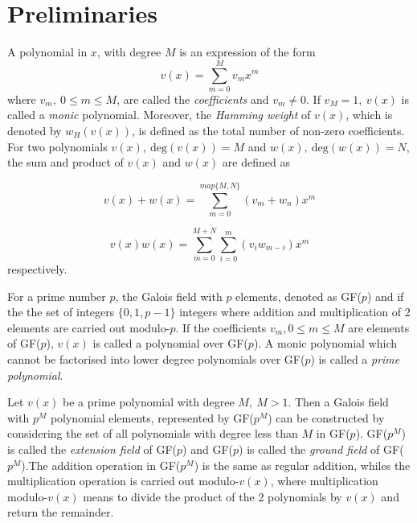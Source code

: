 \section{Preliminaries}
\label{secPrelim}

A polynomial in $x$, with degree $M$ is an expression of the form
\begin{equation*}
v(x) = \sum_{m=0}^{M} v_mx^m
\end{equation*}
where $v_m,~0 \leq m \leq M$, are called the \textit{coefficients}  and $v_m \neq 0$. If $v_M=1,~v(x)$ is called a \textit{monic} polynomial.
Moreover, the \textit{Hamming weight} of $v(x)$, which is denoted by $w_H(v(x))$, is defined as the total number of non-zero coefficients.
For two polynomials $v(x),~\text{deg}(v(x))=M$ and $w(x),~\text{deg}(w(x))=N$, the sum and product of $v(x)$ and $w(x)$ are defined as 

\begin{equation*}
v(x)+w(x)=\sum_{m=0}^{map\{ M,N\}} (v_m +w_n)x^m
\end{equation*}

\begin{equation*}
v(x)w(x)=\sum_{m=0}^{ M+N} \sum_{i=0}^{m} (v_i w_{m-i})x^m
\end{equation*}
 respectively.

For a prime number $p$, the Galois field with $p$ elements, denoted as GF($p$) and if the the set of integers $\{ 0,1,p-1\}$ integers where addition and multiplication of 2 elements are carried out modulo-$p$. If the coefficients $v_m, 0 \leq m \leq M$ are elements of GF($p$), $v(x)$ is called a polynomial over GF($p$). 
A monic polynomial which cannot be factorised into lower degree polynomials over GF($p$) is called a \textit{prime polynomial}.

Let $v(x)$ be a prime polynomial with degree $M,~M>1$. Then a Galois field with $p^M$ polynomial elements, represented by GF($p^M$) can be constructed by considering the set of all polynomials with degree less than $M$ in GF($p$).
GF($p^M$) is called the \textit{extension field} of GF($p$) and GF($p$) is called the \textit{ground field} of GF($p^M$).The addition operation in GF($p^M$) is the same as regular addition, whiles the multiplication operation is carried out modulo-$v(x)$, where multiplication modulo-$v(x)$ means to divide the product of the 2 polynomials by $v(x)$ and return the remainder.


